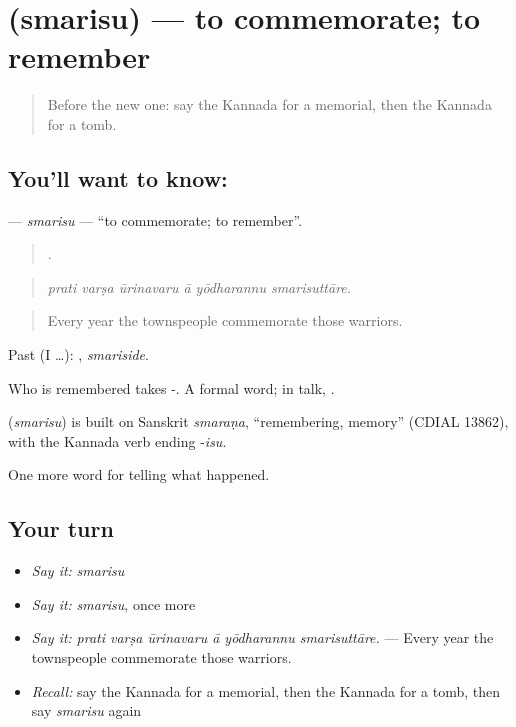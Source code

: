 \section[\texorpdfstring{\kn{ಸ್ಮರಿಸು} (smarisu)}{ಸ್ಮರಿಸು (smarisu)}]{ (smarisu) — to commemorate; to remember}

\label{lesson:KA-C361-smarisu}



\begin{quote}
Before the new one: say the Kannada for a memorial, then the Kannada for a tomb.
\end{quote}

\subsection*{You'll want to know: }
\textbf{} — \emph{smarisu} — \textquotedblleft{}to commemorate; to remember\textquotedblright{}.

\begin{quote}
     .
\end{quote}

\begin{quote}
\emph{prati varṣa ūrinavaru ā yōdharannu smarisuttāre.}
\end{quote}

\begin{quote}
Every year the townspeople commemorate those warriors.
\end{quote}

Past (I …): , \emph{smariside}.

Who is remembered takes -. A formal word; in talk, .

\begin{cousinweb}
\textbf{} (\emph{smarisu}) is built on Sanskrit \emph{smaraṇa}, \textquotedblleft{}remembering, memory\textquotedblright{} (CDIAL 13862), with the Kannada verb ending -\emph{isu}.
\end{cousinweb}

\begin{grammarlens}[title={What you've built}]
One more word for telling what happened.
\end{grammarlens}

\subsection*{Your turn}
\begin{itemize}
\raggedright
  \item \emph{Say it:} \emph{smarisu}
  \item \emph{Say it:} \emph{smarisu}, once more
  \item \emph{Say it:} \emph{prati varṣa ūrinavaru ā yōdharannu smarisuttāre.} — Every year the townspeople commemorate those warriors.
  \item \emph{Recall:} say the Kannada for a memorial, then the Kannada for a tomb, then say \emph{smarisu} again
\end{itemize}

